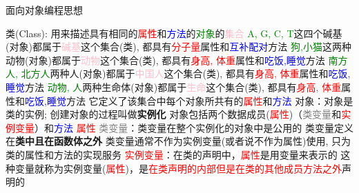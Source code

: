 \begin{frame}{面向对象编程思想}
    \small
    \begin{myoutline}
        \1 类(Class):
            \2 用来描述具有相同的\textcolor{red}{属性}和\textcolor{blue}{方法}的\textcolor{green}{对象}的\textcolor{pink}{集合}
                    \3 \textcolor{green}{A, G, C, T}这四个碱基(对象)都属于\textcolor{pink}{碱基}这个集合(类), 都具有\textcolor{red}{分子量}属性和\textcolor{blue}{互补配对}方法
                    \3 \textcolor{green}{狗,小猫}这两种动物(对象)都属于\textcolor{pink}{动物}这个集合(类), 都具有\textcolor{red}{身高, 体重}属性和\textcolor{blue}{吃饭,睡觉}方法
                    \3 \textcolor{green}{南方人,  北方人}两种人(对象)都属于\textcolor{pink}{中国人}这个集合(类), 都具有\textcolor{red}{身高, 体重}属性和\textcolor{blue}{吃饭,睡觉}方法
                    \3 \textcolor{green}{动物, 人}两种生命体(对象)都属于\textcolor{pink}{生命}这个集合(类), 都具有\textcolor{red}{身高, 体重}属性和\textcolor{blue}{吃饭,睡觉}方法
            \2 它定义了该集合中每个对象所共有的\textcolor{red}{属性}和\textcolor{blue}{方法}
        \1 对象：对象是类的实例; 创建对象的过程叫做\textbf{实例化}
            \2 对象包括两个数据成员(\textcolor{red}{属性})（\textcolor{gray}{类变量}和\textcolor{red}{实例变量}）和\textcolor{blue}{方法}
        \1 \textcolor{red}{属性}
            \2 \textcolor{gray}{类变量}：类变量在整个实例化的对象中是公用的
                \3 类变量定义在\textbf{类中且在函数体之外}
                \3 类变量通常不作为实例变量(或者说不作为属性)使用, 只为类的属性和方法的实现服务
            \2 \textcolor{red}{实例变量}：在类的声明中，\textcolor{red}{属性}是用变量来表示的
                \3 这种变量就称为实例变量(\textcolor{red}{属性})，是\textcolor{red}{在类声明的内部但是在类的其他成员方法之外}声明的
    \end{myoutline}
\end{frame}
